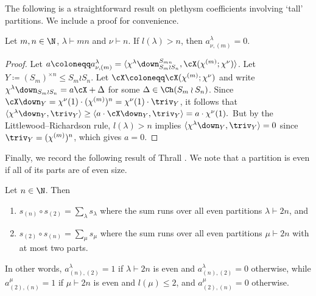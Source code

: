 The following is a straightforward result on plethysm coefficients involving `tall' partitions. We include a proof for convenience.
\begin{lemma}\label{lem:tall-pleth}
	Let $m,n\in\N$, $\lambda\vdash mn$ and $\nu\vdash n$. If $l(\lambda)>n$, then $a^\lambda_{\nu,(m)}=0$.
\end{lemma}

\begin{proof}
	Let $a\coloneqq a^\lambda_{\nu,(m)}= \langle \chi^\lambda\down^{S_{mn}}_{S_m\wr S_n}, \cX(\chi^{(m)};\chi^\nu)\rangle$. Let $Y\coloneqq (S_m)^{\times n}\le S_m\wr S_n$. 
	Let $\cX\coloneqq \cX(\chi^{(m)};\chi^\nu)$ and write $\chi^\lambda\down_{S_m\wr S_n} = a\cX + \Delta$ for some $\Delta\in\Ch(S_m\wr S_n)$. Since $\cX\down_Y = \chi^\nu(1)\cdot(\chi^{(m)})^n=\chi^\nu(1)\cdot\triv_Y$, it follows that $\langle \chi^\lambda\down_Y,\triv_Y\rangle \ge \langle a\cdot \cX\down_Y, \triv_Y\rangle = a\cdot\chi^\nu(1).$
	But by the Littlewood--Richardson rule, $l(\lambda)>n$ implies $\langle \chi^\lambda\down_Y,\triv_Y\rangle=0$ since $\triv_Y = (\chi^{(m)})^n$, which gives $a=0$.
\end{proof}

Finally, we record the following result of Thrall \cite{T}. We note that a partition is even if all of its parts are of even size.
\begin{proposition}\label{prop:thrall}
	Let $n\in\N$. Then 
	\begin{enumerate}[label=\textup{(\roman*)}]
		\item $s_{(n)}\circ s_{(2)} = \sum_\lambda s_\lambda$ where the sum runs over all even partitions $\lambda\vdash 2n$, and
		\item $s_{(2)}\circ s_{(n)} = \sum_\mu s_\mu$ where the sum runs over all even partitions $\mu\vdash 2n$ with at most two parts.
	\end{enumerate}
\end{proposition}
In other words, $a^\lambda_{(n),(2)}=1$ if $\lambda\vdash 2n$ is even and $a^\lambda_{(n),(2)}=0$ otherwise, while $a^\mu_{(2),(n)}=1$ if $\mu\vdash 2n$ is even and $l(\mu)\le 2$, and $a^\mu_{(2),(n)}=0$ otherwise.



